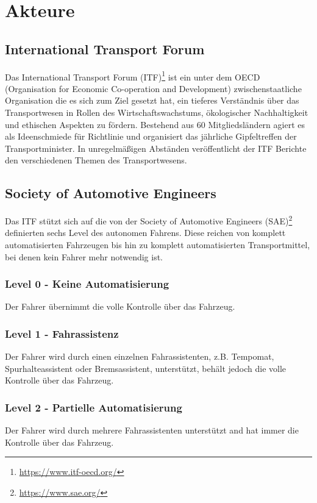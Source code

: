 \section{Akteure}

\subsection{International Transport Forum}


Das International Transport Forum (ITF)\footnote{\url{https://www.itf-oecd.org/}} ist ein unter dem OECD (Organisation for Economic Co-operation and Development) zwischenstaatliche Organisation die es sich zum Ziel gesetzt hat, ein tieferes Verständnis über das Transportwesen in Rollen des Wirtschaftswachstums, ökologischer Nachhaltigkeit und ethischen Aspekten zu fördern. Bestehend aus 60 Mitgliedsländern agiert es als Ideenschmiede für Richtlinie und organisiert das jährliche Gipfeltreffen der Transportminister. In unregelmäßigen Abständen veröffentlicht der ITF Berichte den verschiedenen Themen des Transportwesens.

\subsection{Society of Automotive Engineers}

\cite{standardSAE}\cite{smith2015automated} Das ITF stützt sich auf die von der Society of Automotive Engineers (SAE)\footnote{\url{https://www.sae.org/}}  definierten sechs Level des autonomen Fahrens. Diese reichen von komplett automatisierten Fahrzeugen bis hin zu komplett automatisierten Transportmittel, bei denen kein Fahrer mehr notwendig ist.\\

\subsubsection{Level 0 - Keine Automatisierung}
Der Fahrer übernimmt die volle Kontrolle über das Fahrzeug.

\subsubsection{Level 1 - Fahrassistenz}
Der Fahrer wird durch einen einzelnen Fahrassistenten, z.B. Tempomat, Spurhalteassistent oder Bremsassistent, unterstützt, behält jedoch die volle Kontrolle über das Fahrzeug.

\subsubsection{Level 2 - Partielle Automatisierung} 
Der Fahrer wird durch mehrere Fahrassistenten unterstützt and hat immer die Kontrolle über das Fahrzeug.
    
